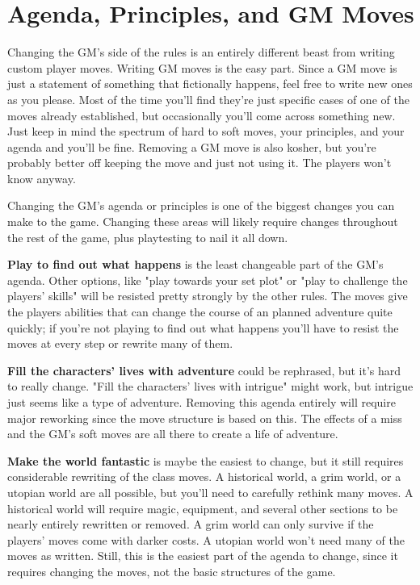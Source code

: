  
\section{Agenda, Principles, and GM Moves}      
 

Changing the GM's side of the rules is an entirely different beast from writing custom player moves. Writing GM moves is the easy part. Since a GM move is just a statement of something that fictionally happens, feel free to write new ones as you please. Most of the time you'll find they're just specific cases of one of the moves already established, but occasionally you'll come across something new. Just keep in mind the spectrum of hard to soft moves, your principles, and your agenda and you'll be fine. Removing a GM move is also kosher, but you're probably better off keeping the move and just not using it. The players won't know anyway.

 

Changing the GM's agenda or principles is one of the biggest changes you can make to the game. Changing these areas will likely require changes throughout the rest of the game, plus playtesting to nail it all down.

 

{\bf Play to find out what happens}  is the least changeable part of the GM's agenda. Other options, like "play towards your set plot" or "play to challenge the players' skills" will be resisted pretty strongly by the other rules. The moves give the players abilities that can change the course of an planned adventure quite quickly; if you're not playing to find out what happens you'll have to resist the moves at every step or rewrite many of them.

 

{\bf Fill the characters' lives with adventure}  could be rephrased, but it's hard to really change. "Fill the characters' lives with intrigue" might work, but intrigue just seems like a type of adventure. Removing this agenda entirely will require major reworking since the move structure is based on this. The effects of a miss and the GM's soft moves are all there to create a life of adventure.

 

{\bf Make the world fantastic}  is maybe the easiest to change, but it still requires considerable rewriting of the class moves. A historical world, a grim world, or a utopian world are all possible, but you'll need to carefully rethink many moves. A historical world will require magic, equipment, and several other sections to be nearly entirely rewritten or removed. A grim world can only survive if the players' moves come with darker costs. A utopian world won't need many of the moves as written. Still, this is the easiest part of the agenda to change, since it requires changing the moves, not the basic structures of the game.

